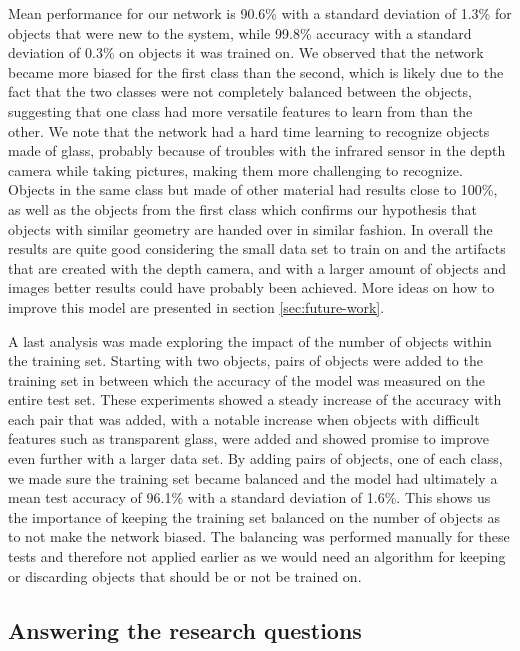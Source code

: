 Mean performance for our network is 90.6\% with a standard deviation of 1.3\% for objects that were new to the system, while 99.8\% accuracy with a standard deviation of 0.3\% on objects it was trained on. We observed that the network became more biased for the first class than the second, which is likely due to the fact that the two classes were not completely balanced between the objects, suggesting that one class had more versatile features to learn from than the other. We note that the network had a hard time learning to recognize objects made of glass, probably because of troubles with the infrared sensor in the depth camera while taking pictures, making them more challenging to recognize. Objects in the same class but made of other material had results close to 100\%, as well as the objects from the first class which confirms our hypothesis that objects with similar geometry are handed over in similar fashion. In overall the results are quite good considering the small data set to train on and the artifacts that are created with the depth camera, and with a larger amount of objects and images better results could have probably been achieved. More ideas on how to improve this model are presented in section \ref{sec:future-work}.

A last analysis was made exploring the impact of the number of objects within the training set. Starting with two objects, pairs of objects were added to the training set in between which the accuracy of the model was measured on the entire test set. These experiments showed a steady increase of the accuracy with each pair that was added, with a notable increase when objects with difficult features such as transparent glass, were added and showed promise to improve even further with a larger data set. By adding pairs of objects, one of each class, we made sure the training set became balanced and the model had ultimately a mean test accuracy of 96.1\% with a standard deviation of 1.6\%. This shows us the importance of keeping the training set balanced on the number of objects as to not make the network biased. The balancing was performed manually for these tests and therefore not applied earlier as we would need an algorithm for keeping or discarding objects that should be or not be trained on.



\subsection*{Answering the research questions}


